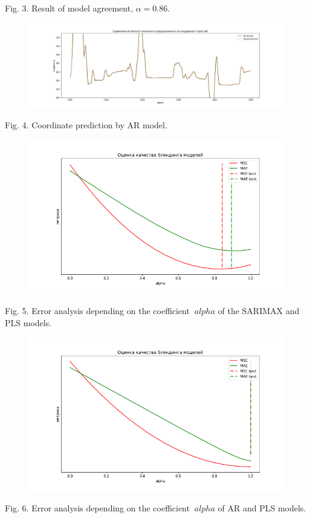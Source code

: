 \documentclass{article}
\begin{document}
Fig. 3. Result of model agreement, $\alpha = 0.86$.
\begin{figure}[H]
\includegraphics[scale=0.34]{images/4.png}
\end{figure}
Fig. 4. Coordinate prediction by AR model.
\begin{figure}[H]
\includegraphics[scale=0.34]{images/5.png}
\end{figure}
Fig. 5. Error analysis depending on the coefficient $\ alpha $ of the SARIMAX and PLS models.
\begin{figure}[H]
\includegraphics[scale=0.34]{images/6.png}
\end{figure}
Fig. 6. Error analysis depending on the coefficient $\ alpha $ of AR and PLS models.
\end{document}
